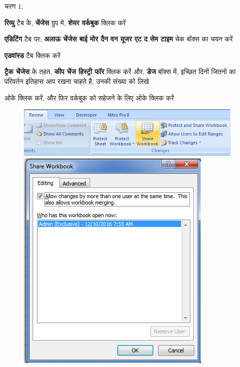 \begin{descriptionSimple}{चरण 1:}
\item[चरण 1] \textbf{रिव्यु} टैब केे, \textbf{चेंजेस} ग्रुप मे, \textbf{शेयर वर्कबुक} क्लिक करें
\item[चरण 2] \textbf{एडिटिंग} टैब पर, \textbf{अलाऊ चेंजेस बाई मोर दैन वन यूजर एट द सेम टाइम} चेक बॉक्स का चयन करें
\item[चरण 3] \textbf{एडवांस्ड} टैब क्लिक करें
\item[चरण 4] \textbf{ट्रैक चेंजेस} के तहत, \textbf{कीप चेंज हिस्ट्री फॉर} क्लिक करें और, \textbf{डेज} बॉक्स में, इच्छित दिनों जितनो का परिवर्तन इतिहास आप रखना चाहते है, उनकी संख्या को लिखे
\item[चरण 5] ओके क्लिक करें, और फिर वर्कबुक को सहेजने के लिए ओके क्लिक करें
\end{descriptionSimple}
\begin{figure}[H]
\centering
\includegraphics[scale=0.4]{src/images/chapter1/chapter1_fig68.png}\qquad
\includegraphics[scale=0.4]{src/images/chapter1/chapter1_fig69.png}
\end{figure}
